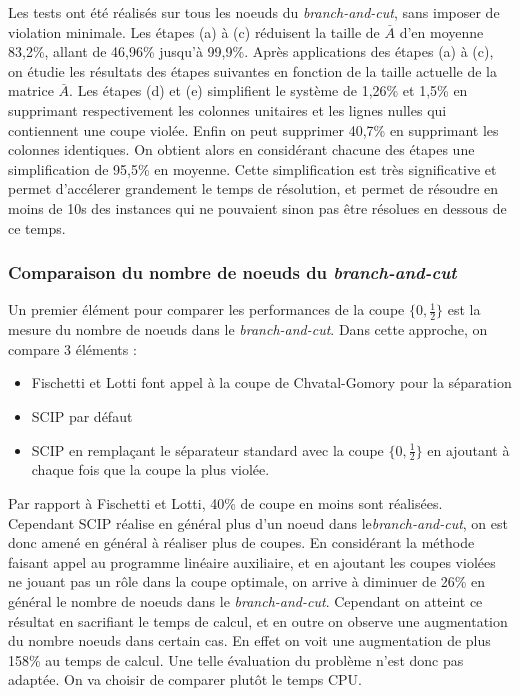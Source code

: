 \documentclass[12pt]{report}
\begin{document}
Les tests ont été réalisés sur tous les noeuds du \textit{branch-and-cut}, sans imposer de violation minimale.
Les étapes (a) à (c) réduisent la taille de $\overset{\_}{A}$ d'en moyenne 83,2\%, allant de 46,96\% jusqu'à 99,9\%.
Après applications des étapes (a) à (c), on étudie les résultats des étapes suivantes en fonction de la taille actuelle de la matrice $\overset{\_}{A}$. Les étapes (d) et (e) simplifient le système de 1,26\% et 1,5\% en supprimant respectivement les colonnes unitaires et les lignes nulles qui contiennent une coupe violée. Enfin on peut supprimer 40,7\% en supprimant les colonnes identiques.
On obtient alors en considérant chacune des étapes une simplification de 95,5\% en moyenne.
Cette simplification est très significative et permet d'accélerer grandement le temps de résolution, et permet de résoudre en moins de 10s des instances qui ne pouvaient sinon pas être résolues en dessous de ce temps.

\subsubsection{Comparaison du nombre de noeuds du \textit{branch-and-cut}}
Un premier élément pour comparer les performances de la coupe $\{0,\frac{1}{2}\}$ est la mesure du nombre de noeuds dans le \textit{branch-and-cut}. Dans cette approche, on compare 3 éléments :
\begin{itemize}
    \item Fischetti et Lotti font appel à la coupe de Chvatal-Gomory pour la séparation
    \item SCIP par défaut
    \item SCIP en remplaçant le séparateur standard avec la coupe $\{0,\frac{1}{2}\}$ en ajoutant à chaque fois que la coupe la plus violée.
\end{itemize}
Par rapport à Fischetti et Lotti, 40\% de coupe en moins sont réalisées. Cependant SCIP réalise en général plus d'un noeud dans le\textit{branch-and-cut}, on est donc amené en général à réaliser plus de coupes.
En considérant la méthode faisant appel au programme linéaire auxiliaire, et en ajoutant les coupes violées ne jouant pas un rôle dans la coupe optimale, on arrive à diminuer de 26\% en général le nombre de noeuds dans le \textit{branch-and-cut}. Cependant on atteint ce résultat en sacrifiant le temps de calcul, et en outre on observe une augmentation du nombre noeuds dans certain cas. En effet on voit une augmentation de plus 158\% au temps de calcul.
Une telle évaluation du problème n'est donc pas adaptée. On va choisir de comparer plutôt le temps CPU.
\end{document}
